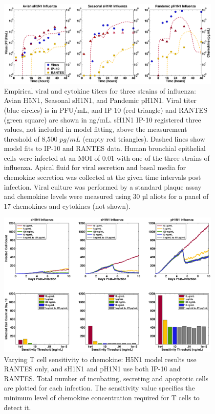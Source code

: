 \documentclass[10pt]{article}
\begin{document}
\begin{figure}[ht!]
\begin{center}
 \includegraphics[width=\textwidth]{data}
 \end{center}
\caption{Empirical viral and cytokine titers for three strains of influenza: Avian H5N1, Seasonal sH1N1, and Pandemic pH1N1.  Viral titer (blue circles) is in PFU/mL, and IP-10 (red triangle) and RANTES (green square) are shown in ng/mL.  sH1N1 IP-10 registered three values, not included in model fitting, above the measurement threshold of 8,500 $pg/mL$ (empty red triangles).  Dashed lines show model fits to IP-10 and RANTES data.  Human bronchial epithelial cells were infected at an MOI of 0.01 with one of the three strains of influenza.  Apical fluid for viral secretion and basal media for chemokine secretion was collected at the given time intervals post infection.  Viral culture was performed by a standard plaque assay and chemokine levels were measured using 30 µl aliots for a panel of 17 chemokines and cytokines (not shown).} 
 \label{fig:data}
\end{figure}


\begin{figure}[ht!]
\begin{center}
 \includegraphics[width=\textwidth]{sensitivity}
 \end{center}
\caption{Varying T cell sensitivity to chemokine: H5N1 model results use RANTES  only, and sH1N1 and pH1N1 use both IP-10 and RANTES. Total number of incubating, secreting and apoptotic cells are plotted for each infection.  The sensitivity value specifies the minimum level of chemokine concentration required for T cells to detect it. } 
 \label{fig:sensitivity}
\end{figure}
\end{document}
